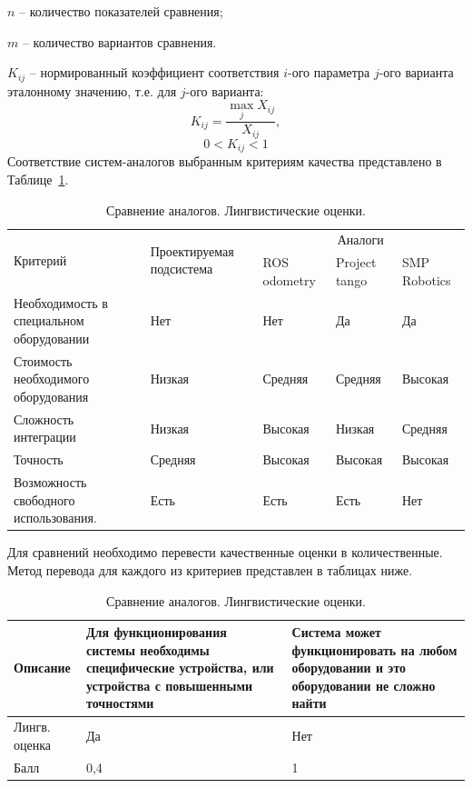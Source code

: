 $n$ – количество показателей сравнения;

$m$ – количество вариантов сравнения.

$K_{ij}$ – нормированный коэффициент соответствия $i$-ого параметра $j$-ого варианта эталонному значению, т.е. для $j$-ого варианта:
$$ K_{ij} = \frac{\max_{j} X_{ij}} {X_{ij}}, $$
$$ 0 < K_{ij} < 1 $$
Соответствие систем-аналогов выбранным критериям качества представлено в Таблице~\ref{tab:srav_ling}.

\begin{table}[!htb]
	\caption{Сравнение аналогов. Лингвистические оценки.}\label{tab:srav_ling}
    \centering
	\begin{tabular}{|p{4cm}|p{4cm}|p{2cm}|p{2cm}|p{2cm}|}
	\hline 
	\multirow{2}{4cm}{Критерий} & \multirow{2}{4cm}{Проектируемая подсистема} & 	\multicolumn{3}{c|}{Аналоги}\\ 
	\cline{3-5}
	 &   & ROS odometry & Project tango & SMP Robotics \\ 
	\hline 
	Необходимость в специальном оборудовании & Нет & Нет & Да & Да \\ 
	\hline 
	Стоимость необходимого оборудования & Низкая & Средняя & Средняя & Высокая \\ 	
	\hline 
	Сложность интеграции & Низкая & Высокая & Низкая & Средняя \\
	\hline 
	Точность & Средняя & Высокая & Высокая & Высокая \\ 
	\hline 
	Возможность свободного использования.& Есть & Есть & Есть & Нет \\ 
	\hline 
	\end{tabular}
\end{table} 

Для сравнений необходимо перевести качественные оценки в количественные. Метод перевода для каждого из критериев представлен в таблицах ниже.

\begin{table}[!htb]
	\caption{Сравнение аналогов. Лингвистические оценки.}
    \centering
	\begin{tabular}{|p{3cm}|p{6cm}|p{6cm}|}
	\hline 
	Описание & Для функционирования системы необходимы специфические устройства, или устройства с повышенными точностями & Система может функционировать на любом оборудовании и это оборудовании не сложно найти \\ 
	\hline 
	Лингв. оценка & Да & Нет \\ 
	\hline 
	Балл & 0,4 & 1 \\ 
	\hline 
	\end{tabular} 
\end{table} 

